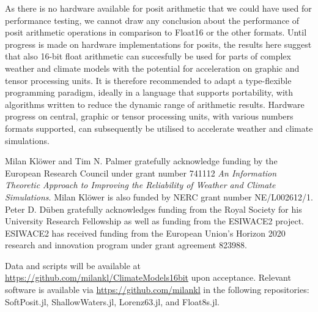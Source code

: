 \documentclass[draft]{agujournal2019}
\begin{document}
As there is no hardware available for posit arithmetic that we could have used for performance testing, we cannot draw any conclusion about the performance of posit arithmetic operations in comparison to Float16 or the other formats.
Until progress is made on hardware implementations for posits, the results here suggest that also 16-bit float arithmetic can succesfully be used for parts of complex weather and climate models with the potential for acceleration on graphic and tensor processing units.
It is therefore recommended to adapt a type-flexible programming paradigm, ideally in a language that supports portability, with algorithms written to reduce the dynamic range of arithmetic results.
Hardware progress on central, graphic or tensor processing units, with various numbers formats supported, can subsequently be utilised to accelerate weather and climate simulations.


\acknowledgments
Milan Kl\"{o}wer and Tim N. Palmer gratefully acknowledge funding by the European Research Council under grant number 741112 \emph{An Information Theoretic Approach to Improving the Reliability of Weather and Climate Simulations}. Milan Kl\"{o}wer is also funded by NERC grant number NE/L002612/1.  Peter D. D\"{u}ben gratefully acknowledges funding from the Royal Society for his University Research Fellowship as well as funding from the ESIWACE2 project. ESIWACE2 has received funding from the European Union's Horizon 2020 research and innovation program under grant agreement 823988.

Data and scripts will be available at
\url{https://github.com/milankl/ClimateModels16bit} upon acceptance. Relevant software is available via \url{https://github.com/milankl} in the following repositories: SoftPosit.jl, ShallowWaters.jl, Lorenz63.jl, and Float8s.jl.


\end{document}
